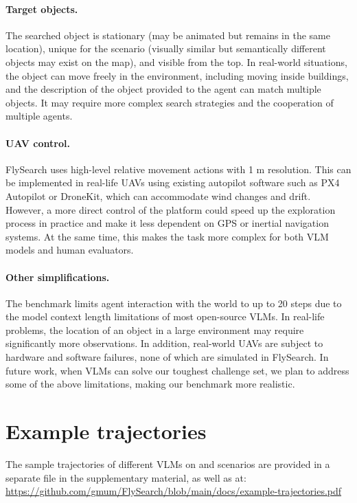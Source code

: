 \paragraph{Target objects.} The searched object is stationary (may be animated but remains in the same location), unique for the scenario (visually similar but semantically different objects may exist on the map), and visible from the top. In real-world situations, the object can move freely in the environment, including moving inside buildings, and the description of the object provided to the agent can match multiple objects. It may require more complex search strategies and the cooperation of multiple agents.
\paragraph{UAV control.} FlySearch uses high-level relative movement actions with 1 m resolution. This can be implemented in real-life UAVs using existing autopilot software such as PX4 Autopilot or DroneKit, which can accommodate wind changes and drift. However, a more direct control of the platform could speed up the exploration process in practice and make it less dependent on GPS or inertial navigation systems. At the same time, this makes the task more complex for both VLM models and human evaluators.
\paragraph{Other simplifications.} The benchmark limits agent interaction with the world to up to 20 steps due to the model context length limitations of most open-source VLMs. In real-life problems, the location of an object in a large environment may require significantly more observations. In addition, real-world UAVs are subject to hardware and software failures, none of which are simulated in FlySearch.
In future work, when VLMs can solve our toughest challenge set, we plan to address some of the above limitations, making our benchmark more realistic.


\section{Example trajectories}

\label{app:trajectories}

The sample trajectories of different VLMs on \challenge{} and \hardchallenge{} scenarios are provided in a separate file in the supplementary material, as well as at: \url{https://github.com/gmum/FlySearch/blob/main/docs/example-trajectories.pdf}



